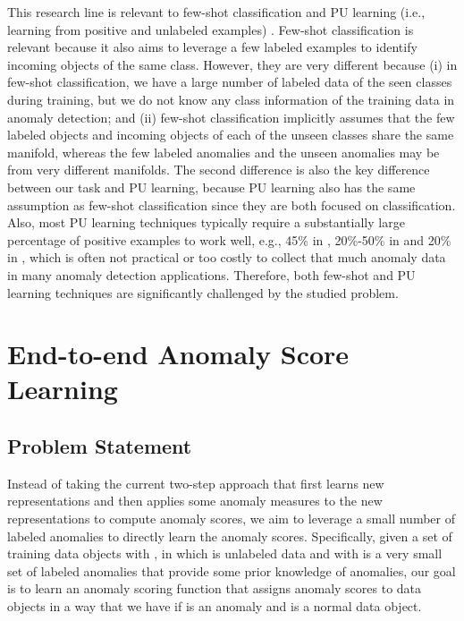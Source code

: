 \documentclass[sigconf]{acmart}
\begin{document}
This research line is relevant to few-shot classification \cite{fei2006oneshot,snell2017protonet} and PU learning (i.e., learning from positive and unlabeled examples) \cite{li2003pul,elkan2008pul,sansone2018pul}. Few-shot classification is relevant because it also aims to leverage a few labeled examples to identify incoming objects of the same class. However, they are very different because (i) in few-shot classification, we have a large number of labeled data of the seen classes during training, but we do not know any class information of the training data in anomaly detection; and (ii) few-shot classification implicitly assumes that the few labeled objects and incoming objects of each of the unseen classes share the same manifold, whereas the few labeled anomalies and the unseen anomalies may be from very different manifolds. The second difference is also the key difference between our task and PU learning, because PU learning also has the same assumption as few-shot classification since they are both focused on classification. Also, most PU learning techniques typically require a substantially large percentage of positive examples to work well, e.g., 45\% in \cite{li2003pul}, 20\%-50\% in \cite{elkan2008pul} and 20\% in \cite{sansone2018pul}, which is often not practical or too costly to collect that much anomaly data in many anomaly detection applications. Therefore, both few-shot and PU learning techniques are significantly challenged by the studied problem.







\section{End-to-end Anomaly Score Learning}

\subsection{Problem Statement}

Instead of taking the current two-step approach that first learns new representations and then applies some anomaly measures to the new representations to compute anomaly scores, we aim to leverage a small number of labeled anomalies to directly learn the anomaly scores. Specifically, given a set of  training data objects  with , in which  is unlabeled data and  with  is a very small set of labeled anomalies that provide some prior knowledge of anomalies, our goal is to learn an anomaly scoring function  that assigns anomaly scores to data objects in a way that we have  if  is an anomaly and  is a normal data object. 
\end{document}
